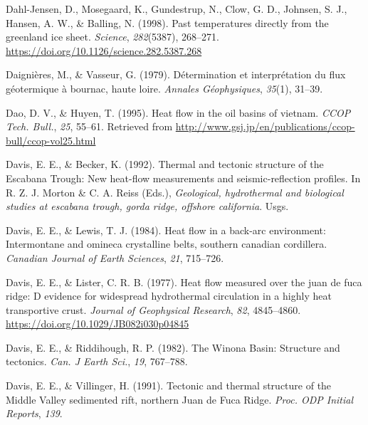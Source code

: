 \documentclass[draft,linenumbers]{agujournal2018}
\begin{document}
\leavevmode{}%
Dahl-Jensen, D., Mosegaard, K., Gundestrup, N., Clow, G. D., Johnsen, S.
J., Hansen, A. W., \& Balling, N. (1998). Past temperatures directly
from the greenland ice sheet. \emph{{Science}}, \emph{282}(5387),
268--271. \url{https://doi.org/10.1126/science.282.5387.268}

\leavevmode{}%
Daignières, M., \& Vasseur, G. (1979). Détermination et interprétation
du flux géotermique à bournac, haute loire. \emph{Annales Géophysiques},
\emph{35}(1), 31--39.

\leavevmode{}%
Dao, D. V., \& Huyen, T. (1995). Heat flow in the oil basins of vietnam.
\emph{CCOP Tech. Bull.}, \emph{25}, 55--61. Retrieved from
\url{http://www.gsj.jp/en/publications/ccop-bull/ccop-vol25.html}

\leavevmode{}%
Davis, E. E., \& Becker, K. (1992). Thermal and tectonic structure of
the {Escabana Trough}: New heat-flow measurements and seismic-reflection
profiles. In R. Z. J. Morton \& C. A. Reiss (Eds.), \emph{Geological,
hydrothermal and biological studies at escabana trough, gorda ridge,
offshore california}. Usgs.

\leavevmode{}%
Davis, E. E., \& Lewis, T. J. (1984). Heat flow in a back-arc
environment: Intermontane and omineca crystalline belts, southern
canadian cordillera. \emph{Canadian Journal of Earth Sciences},
\emph{21}, 715--726.

\leavevmode{}%
Davis, E. E., \& Lister, C. R. B. (1977). Heat flow measured over the
juan de fuca ridge: D evidence for widespread hydrothermal circulation
in a highly heat transportive crust. \emph{Journal of Geophysical
Research}, \emph{82}, 4845--4860.
\url{https://doi.org/10.1029/JB082i030p04845}

\leavevmode{}%
Davis, E. E., \& Riddihough, R. P. (1982). The {Winona Basin}: Structure
and tectonics. \emph{Can. J Earth Sci.}, \emph{19}, 767--788.

\leavevmode{}%
Davis, E. E., \& Villinger, H. (1991). Tectonic and thermal structure of
the {Middle Valley} sedimented rift, northern {Juan de Fuca Ridge}.
\emph{Proc. ODP Initial Reports}, \emph{139}.
\end{document}
